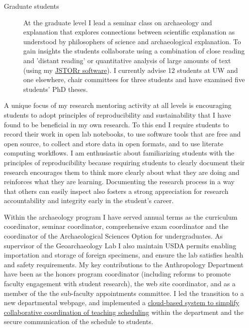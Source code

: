 \documentclass[11pt,article,oneside]{memoir}
\begin{document}
\begin{description}
\item[Graduate students] At the graduate level I lead a seminar class on archaeology and explanation that explores connections between scientific explanation as understood by philosophers of science and archaeological explanation. To gain insights the students collaborate using a combination of close reading and 'distant reading' or quantitative analysis of large amounts of text (using my \href{https://github.com/benmarwick/JSTORr}{JSTORr software}). I currently advise 12 students at UW and one elsewhere, chair committees for three students and have examined five students' PhD theses.
  
\end{description}
    
A unique focus of my research mentoring activity at all levels is encouraging students to adopt principles of reproducibility and sustainability that I have found to be beneficial in my own research. To this end I require students to record their work in open lab notebooks, to use software tools that are free and open source, to collect and store data in open formats, and to use literate computing workflows. I am enthusiastic about familiarizing students with the principles of reproducibility because requiring students to clearly document their research encourages them to think more clearly about what they are doing and reinforces what they are learning. Documenting the research process in a way that others can easily inspect also fosters a strong appreciation for research accountability and integrity early in the student's career. 


\bigskip     


Within the archaeology program I have served annual terms as the curriculum coordinator, seminar coordinator, comprehensive exam coordinator and the coordinator of the Archaeological Sciences Option for undergraduates. As supervisor of the Geoarchaeology Lab I also maintain USDA permits enabling importation and storage of foreign specimens, and ensure the lab satisfies health and safety requirements. My key contributions to the Anthropology Department have been as the honors program coordinator (including reforms to promote faculty engagement with student research), the web site coordinator, and as a member of the the sub-faculty appointments committee. I led the transition to a new departmental webpage, and implemented a \href{https://docs.google.com/a/uw.edu/spreadsheet/ccc?key=0As7CmPqGXTzldF9DclQwY0NaU2JZNjBFQjg4RVdSdWc&single=true&gid=15&output=html}{cloud-based system to simplify collaborative coordination of teaching scheduling} within the department and the secure communication of the schedule to students. 
\end{document}
